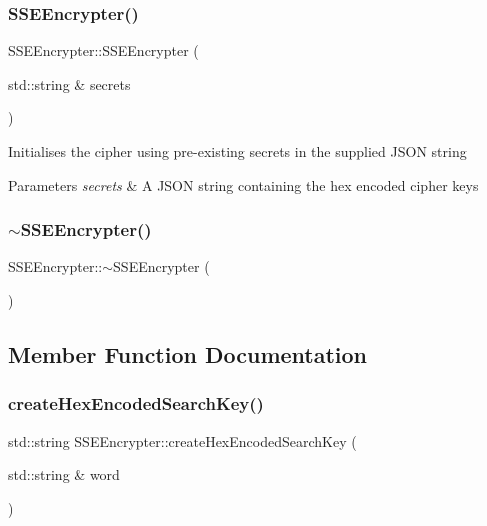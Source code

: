 \subsubsection{\texorpdfstring{S\+S\+E\+Encrypter()}{SSEEncrypter()}\hspace{0.1cm}{\footnotesize\ttfamily [2/2]}}
{\footnotesize\ttfamily S\+S\+E\+Encrypter\+::\+S\+S\+E\+Encrypter (\begin{DoxyParamCaption}\item[{std\+::string \&}]{secrets }\end{DoxyParamCaption})}

Initialises the cipher using pre-\/existing secrets in the supplied J\+S\+ON string 
\begin{DoxyParams}{Parameters}
{\em secrets} & A J\+S\+ON string containing the hex encoded cipher keys \\
\hline
\end{DoxyParams}
\mbox{\label{classSSEEncrypter_a249d1527f2d370c693534c3d435a522a}} 
\subsubsection{\texorpdfstring{$\sim$\+S\+S\+E\+Encrypter()}{~SSEEncrypter()}}
{\footnotesize\ttfamily S\+S\+E\+Encrypter\+::$\sim$\+S\+S\+E\+Encrypter (\begin{DoxyParamCaption}{ }\end{DoxyParamCaption})\hspace{0.3cm}{\ttfamily [virtual]}}



\subsection{Member Function Documentation}
\mbox{\label{classSSEEncrypter_a09dac9d519550e0375f0f677aab69bfb}} 
\subsubsection{\texorpdfstring{create\+Hex\+Encoded\+Search\+Key()}{createHexEncodedSearchKey()}}
{\footnotesize\ttfamily std\+::string S\+S\+E\+Encrypter\+::create\+Hex\+Encoded\+Search\+Key (\begin{DoxyParamCaption}\item[{std\+::string \&}]{word }\end{DoxyParamCaption})}

